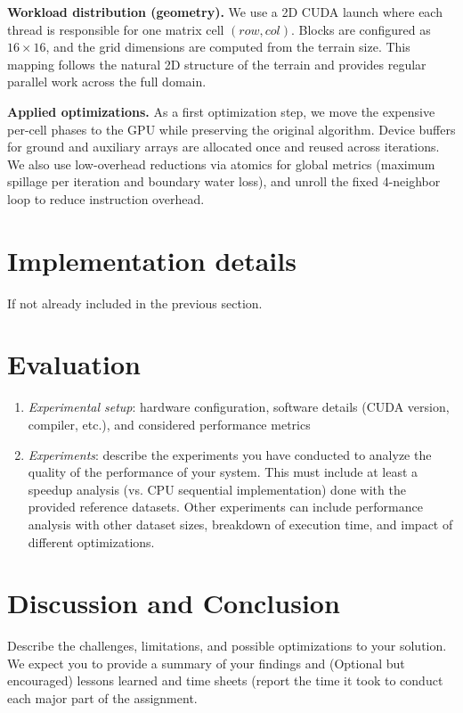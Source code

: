 \documentclass[sigconf, nonacm, review]{acmart}
\begin{document}
\textbf{Workload distribution (geometry).}
We use a 2D CUDA launch where each thread is responsible for one matrix cell $(row,col)$. Blocks are configured as $16\times16$, and the grid dimensions are computed from the terrain size. This mapping follows the natural 2D structure of the terrain and provides regular parallel work across the full domain.

\textbf{Applied optimizations.}
As a first optimization step, we move the expensive per-cell phases to the GPU while preserving the original algorithm. Device buffers for ground and auxiliary arrays are allocated once and reused across iterations. We also use low-overhead reductions via atomics for global metrics (maximum spillage per iteration and boundary water loss), and unroll the fixed 4-neighbor loop to reduce instruction overhead.

\section{Implementation details}
If not already included in the previous section.

\section{Evaluation}

\begin{enumerate}
\item \textit{Experimental setup}: hardware configuration, software details (CUDA version, compiler, etc.), and considered performance metrics
\item \textit{Experiments}: 
\label{experiments} describe the experiments you have conducted to analyze the quality of the performance of your system. This must include at least a speedup analysis (vs. CPU sequential implementation) done with the provided reference datasets. Other experiments can include performance analysis with other dataset sizes, breakdown of execution time, and impact of different optimizations.
\end{enumerate}

\section{Discussion and Conclusion}

Describe the challenges, limitations, and possible optimizations to your solution. We expect you to provide a summary of your findings and (Optional but encouraged) lessons learned and time sheets (report the time it took to conduct each major part of the assignment.




\end{document}
